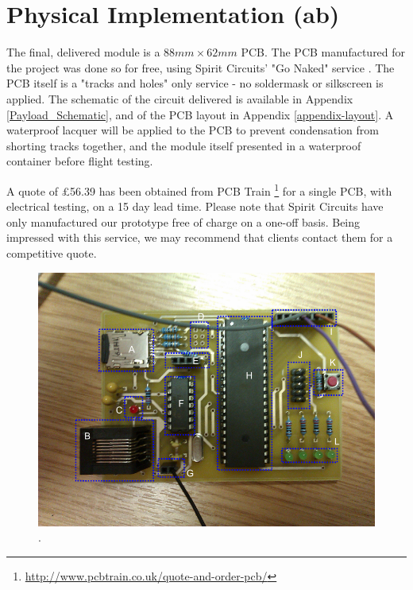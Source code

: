 
\section{Physical Implementation (ab)}
\label{sec:PCB-implementation}

The final, delivered module is a $88mm\times62mm$ PCB. The PCB manufactured 
for the project was done so for free, using Spirit Circuits' "Go Naked"
service \cite{go-naked}. The PCB itself is a "tracks and holes" only service 
- no soldermask or silkscreen is applied. The schematic of the circuit 
delivered is available in Appendix \ref{Payload_Schematic}, and of the PCB layout in Appendix 
\ref{appendix-layout}. A waterproof lacquer will be applied to the PCB to prevent condensation 
from shorting tracks together, and the module itself presented in a 
waterproof container before flight testing.

A quote of \pounds 56.39 has been obtained from PCB Train \footnote{\url{http://www.pcbtrain.co.uk/quote-and-order-pcb/}} 
for a single PCB, with electrical testing, on a 15 day lead time. 
Please note that Spirit Circuits have only manufactured our prototype 
free of charge on a one-off basis. Being impressed with this service, 
we may recommend that clients contact them for a competitive quote.

\begin{figure}[H]
        \centering
        \includegraphics[width=1.00\textwidth]{figures/PayloadImplementation.png}
        . 
        \label{fig:PayloadImplementation}
\end{figure}


